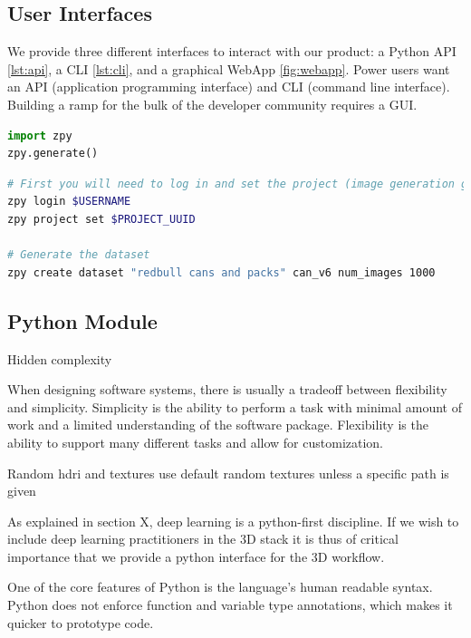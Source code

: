 \documentclass{article}
\begin{document}
\subsection{User Interfaces}
\label{sec:userinterfaces}

We provide three different interfaces to interact with our product: a Python API \ref{lst:api}, a CLI \ref{lst:cli}, and a graphical WebApp \ref{fig:webapp}. Power users want an API (application programming interface) and CLI (command line interface). Building a ramp for the bulk of the developer community requires a GUI.

\begin{lstlisting}[language=Python,caption={Generating a dataset using the zpy python API.},label={lst:api}]
import zpy
zpy.generate()
\end{lstlisting}

\begin{lstlisting}[language=bash,caption={Generating a dataset using the zpy CLI},label={lst:cli}]
# First you will need to log in and set the project (image generation gets billed according to project)
zpy login $USERNAME 
zpy project set $PROJECT_UUID

# Generate the dataset
zpy create dataset "redbull cans and packs" can_v6 num_images 1000
\end{lstlisting}

\subsection{Python Module}
\label{sec:python module}

Hidden complexity

When designing software systems, there is usually a tradeoff between flexibility and simplicity. Simplicity is the ability to perform a task with minimal amount of work and a limited understanding of the software package. Flexibility is the ability to support many different tasks and allow for customization.

Random hdri and textures use default random textures unless a specific path is given

As explained in section X, deep learning is a python-first discipline. If we wish to include deep learning practitioners in the 3D stack it is thus of critical importance that we provide a python interface for the 3D workflow.

One of the core features of Python is the language’s human readable syntax. Python does not enforce function and variable type annotations, which makes it quicker to prototype code.
\end{document}
